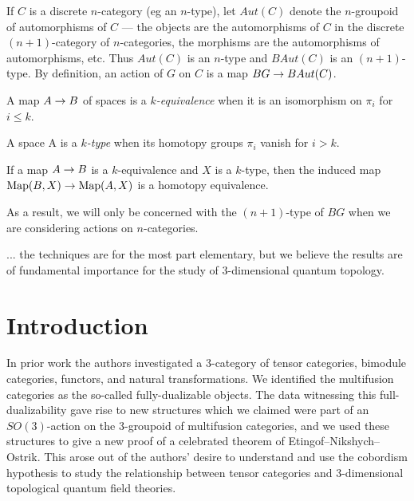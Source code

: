 \documentclass{amsart}
\begin{document}
If $C$ is a discrete $n$-category (eg an $n$-type), let $Aut(C)$ denote the $n$-groupoid of automorphisms of $C$ --- the objects are the automorphisms of $C$ in the discrete $(n+1)$-category of $n$-categories, the morphisms are the automorphisms of automorphisms, etc.  Thus $Aut(C)$ is an $n$-type and $BAut(C)$ is an $(n+1)$-type.  By definition, an action of $G$ on $C$ is a map $BG \rightarrow BAut(C)$.

\begin{definition}[$k$-Equivalence]
A map $A \rightarrow B$ of spaces is a \emph{$k$-equivalence} when it is an isomorphism on $\pi_i$ for $i \leq k$.
\end{definition}

\begin{definition}[$k$-Type]
A space A is a \emph{$k$-type} when its homotopy groups $\pi_i$ vanish for $i > k$.
\end{definition}

\begin{obs}
If a map $A \rightarrow B$ is a $k$-equivalence and $X$ is a $k$-type, then the induced map $\mathrm{Map}(B,X) \rightarrow \mathrm{Map}(A,X)$ is a homotopy equivalence.
\end{obs}


  As a result, we will only be concerned with the $(n+1)$-type of $BG$ when we are considering actions on $n$-categories.


... the techniques are for the most part elementary, but we believe the results are of fundamental importance for the study of 3-dimensional quantum topology.


\section{Introduction}

In prior work the authors investigated a 3-category of tensor categories, bimodule categories, functors, and natural transformations. We identified the multifusion categories as the so-called fully-dualizable objects. The data witnessing this full-dualizability gave rise to new structures which we claimed were part of an $SO(3)$-action on the 3-groupoid of multifusion categories, and we used these structures to give a new proof of a celebrated theorem of Etingof--Nikshych--Ostrik. This arose out of the authors' desire to understand and use the cobordism hypothesis to study the relationship between tensor categories and 3-dimensional topological quantum field theories. 
\end{document}
